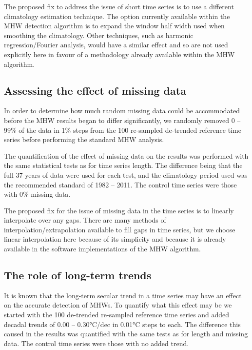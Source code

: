 \documentclass[]{article}
\begin{document}
The proposed fix to address the issue of short time series is to use a
different climatology estimation technique. The option currently
available within the MHW detection algorithm is to expand the window
half width used when smoothing the climatology. Other techniques, such
as harmonic regression/Fourier analysis, would have a similar effect and
so are not used explicitly here in favour of a methodology already
available within the MHW algorithm.

\hypertarget{assessing-the-effect-of-missing-data}{%
\subsection{Assessing the effect of missing
data}\label{assessing-the-effect-of-missing-data}}

In order to determine how much random missing data could be accommodated
before the MHW results began to differ significantly, we randomly
removed 0 -- 99\% of the data in 1\% steps from the 100 re-sampled
de-trended reference time series before performing the standard MHW
analysis.

The quantification of the effect of missing data on the results was
performed with the same statistical tests as for time series length. The
difference being that the full 37 years of data were used for each test,
and the climatology period used was the recommended standard of 1982 --
2011. The control time series were those with 0\% missing data.

The proposed fix for the issue of missing data in the time series is to
linearly interpolate over any gaps. There are many methods of
interpolation/extrapolation available to fill gaps in time series, but
we choose linear interpolation here because of its simplicity and
because it is already available in the software implementations of the
MHW algorithm.

\hypertarget{the-role-of-long-term-trends}{%
\subsection{The role of long-term
trends}\label{the-role-of-long-term-trends}}

It is known that the long-term secular trend in a time series may have
an effect on the accurate detection of MHWs. To quantify what this
effect may be we started with the 100 de-trended re-sampled reference
time series and added decadal trends of 0.00 -- 0.30°C/dec in 0.01°C
steps to each. The difference this caused in the results was quantified
with the same tests as for length and missing data. The control time
series were those with no added trend.
\end{document}
